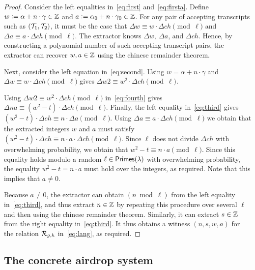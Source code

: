 \documentclass[11pt]{article}
\begin{document}
\begin{proof}
Consider the left equalities in~\eqref{eq:first} and~\eqref{eq:firsta}.
Define $w \mathrel{\mathop:}= \alpha + n \cdot \gamma \in \mathbb Z$ 
and $a \mathrel{\mathop:}= \alpha_0 + n \cdot \gamma_0 \in \mathbb Z$.
For any pair of accepting transcripts such as $({\cal T}_1, {\cal T}_2)$,
it must be the case that 
$\Delta w \equiv w \cdot \Delta \mathit{ch} \pmod{\ell}$ and
$\Delta a \equiv a \cdot \Delta \mathit{ch} \pmod{\ell}$. 
The extractor knows $\Delta w,\ \Delta a$, and $\Delta \mathit{ch}$.
Hence, by constructing a polynomial number of such accepting transcript pairs, 
the extractor can recover $w, a \in \mathbb Z$ using the chinese remainder theorem. 

Next, consider the left equation in~\eqref{eq:second}.
Using $w = \alpha + n \cdot \gamma$ and
$\Delta w \equiv w \cdot \Delta \mathit{ch} \pmod{\ell}$ gives
$\Delta \mathit{w2} \equiv w^2 \cdot \Delta \mathit{ch} \pmod{\ell}$.

Using $\Delta \mathit{w2} \equiv w^2 \cdot \Delta \mathit{ch} \pmod{\ell}$
in~\eqref{eq:fourth}
gives $\Delta \mathit{na} \equiv (w^2 - t) \cdot \Delta \mathit{ch} \pmod{\ell}$. 
Finally, the left equality in~\eqref{eq:third} 
gives $(w^2 - t)\cdot \Delta \mathit{ch} \equiv n \cdot \Delta a \pmod{\ell}$.
Using $\Delta a \equiv a \cdot \Delta \mathit{ch} \pmod{\ell}$
we obtain that the extracted integers $w$ and $a$ must satisfy
$(w^2 - t)\cdot \Delta \mathit{ch} \equiv 
      n \cdot a \cdot \Delta \mathit{ch} \pmod{\ell}$.  
Since $\ell$ does not divide $\Delta \mathit{ch}$ with overwhelming
probability, we obtain that $w^2 - t \equiv n \cdot a \pmod{\ell}$.
Since this equality holds modulo a random $\ell \in \textsf{Primes}(\lambda)$ 
with overwhelming probability, 
the equality $w^2 - t = n \cdot a$ must hold over the integers,
as required.   Note that this implies that $a \neq 0$. 

Because $a \neq 0$, the extractor can obtain $(n \bmod \ell)$
from the left equality in~\eqref{eq:third}, and thus extract $n \in \mathbb Z$ by
repeating this procedure over several $\ell$ and then using the chinese
remainder theorem.  
Similarly, it can extract $s \in \mathbb Z$ from
the right equality in~\eqref{eq:third}.   
It thus obtains a witness $(n, s, w, a)$ 
for the relation ${\cal R}_{g,h}$ in~\eqref{eq:lang}, as required.
\end{proof}




\subsection{The concrete airdrop system}\label{sec:rsa:airdrop}
\end{document}
